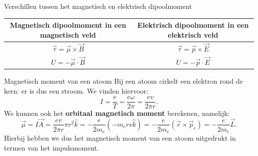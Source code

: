 \begin{vrg}{Verschillen tussen het magnetisch en elektrisch dipoolmoment}
    \vspace{-0.4cm}
    \def\arraystretch{2}
    \centering
    \begin{tabular}{c|c}
       Magnetisch dipoolmoment in een magnetisch veld & Elektrisch dipoolmoment in een elektrisch veld \\ \hline
        $\Vec{\tau} = \Vec{\mu} \times \Vec{B}$ & $\Vec{\tau} = \Vec{p} \times \Vec{E}$ \\ 
        $U = -\Vec{\mu} \cdot \Vec{B}$ & $U = -\Vec{p} \cdot \Vec{E}$ \\
    \end{tabular}
    \vspace{-0.2cm}
\end{vrg}

\begin{app}{Magnetisch moment van een atoom}
    \vspace{-0.1cm}
    Bij een atoom cirkelt een elektron rond de kern: er is dus een stroom. We vinden hiervoor:
    \begin{equation*}
        I = \dfrac{e}{T} = \dfrac{e\omega}{2\pi} = \dfrac{ev}{2\pi r}.
    \end{equation*}
    We kunnen ook het \textbf{orbitaal magnetisch moment} berekenen, namelijk: 
    \begin{equation*}
        \Vec{\mu} = I\Vec{A} = \dfrac{ev}{2\pi r} \pi r^{2} \hat{k} = -\dfrac{e}{2m_{e}}(-m_{e}rv\hat{k}) =  -\frac{e}{2m_{e}}(\vec{r} \times \vec{p}_e)= -\dfrac{e}{2m_{e}}\Vec{L}.
    \end{equation*}
    Hierbij hebben we dus het magnetisch moment van een atoom uitgedrukt in termen van het impulsmoment. 
    \vspace{0cm}
\end{app}

\newpage


